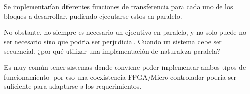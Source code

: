 \begin{center}
\end{center}

\begin{center}
\end{center}



Se implementarían diferentes funciones de transferencia para cada uno de los bloques a desarrollar, pudiendo ejecutarse estos en paralelo. \newline

No obstante, no siempre es necesario un ejecutivo en paralelo, y no solo puede no ser necesario sino que podría ser perjudicial. Cuando un sistema debe ser secuencial, ¿por qué utilizar una implementación de naturaleza paralela? \newline

Es muy común tener sistemas donde conviene poder implementar ambos tipos de funcionamiento, por eso una coexistencia FPGA/Micro-controlador podría ser suficiente para adaptarse a los requerimientos. \newline

